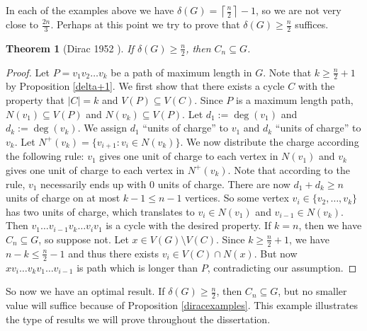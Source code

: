 \documentclass[oneside,12pt]{memoir}
\newtheorem{theorem}{Theorem}[section]
\newcommand{\ceiling}[1]{\left\lceil#1\right\rceil}
\begin{document}
In each of the examples above we have $\delta(G)=\ceiling{\frac{n}{2}}-1$, so we are not very close to $\frac{2n}{3}$. Perhaps at
this point we try to prove that $\delta(G)\geq \frac{n}{2}$ suffices.

\begin{theorem}[Dirac 1952 \cite{D}]
If $\delta(G)\geq \frac{n}{2}$, then $C_n\subseteq G$.
\end{theorem}

\begin{proof}

Let $P=v_1v_2\dots v_k$ be a path of maximum length in $G$.  Note that $k\geq \frac{n}{2}+1$ by Proposition \ref{delta+1}.  We first show that there exists a cycle $C$ with the property that $|C|=k$ and $V(P)\subseteq V(C)$.  Since $P$ is a maximum length path, $N(v_1)\subseteq V(P)$ and $N(v_k)\subseteq V(P)$.  Let $d_1:=\deg(v_1)$ and $d_k:=\deg(v_k)$.  We assign $d_1$ ``units of charge'' to $v_1$ and $d_k$ ``units of charge'' to $v_k$.  Let $N^+(v_k)=\{v_{i+1}:v_i\in N(v_k)\}$.  We now distribute the charge according the following rule: $v_1$ gives one unit of charge to each vertex in $N(v_1)$ and $v_k$ gives one unit of charge to each vertex in $N^+(v_k)$.  Note that according to the rule, $v_1$ necessarily ends up with $0$ units of charge.  There are now $d_1+d_k\geq n$ units of charge on at most $k-1\leq n-1$ vertices.  So some vertex $v_i\in\{v_2,\dots,v_k\}$ has two units of charge, which translates to $v_i\in N(v_1)$ and $v_{i-1}\in N(v_k)$.  Then $v_1\dots v_{i-1}v_k\dots v_iv_1$ is a cycle with the desired property.  If $k=n$, then we have $C_n\subseteq G$, so suppose not.  Let $x\in V(G)\setminus V(C)$.  Since $k\geq \frac{n}{2}+1$, we have $n-k\leq \frac{n}{2}-1$ and thus there exists $v_i\in V(C)\cap N(x)$.  But now $xv_i\dots v_kv_1\dots v_{i-1}$ is path which is longer than $P$, contradicting our assumption.

\end{proof}

So now we have an optimal result.  If $\delta(G)\geq \frac{n}{2}$, then
$C_n\subseteq G$, but no smaller value will suffice because of Proposition \ref{diracexamples}.  This example illustrates the type of results we will prove throughout the dissertation.
\end{document}
